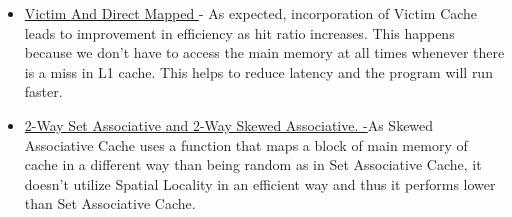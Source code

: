 \documentclass[12pt]{article}
\begin{document}
\begin{itemize}
	\item {\fontsize{14pt}{16.8pt}\selectfont \uline{Victim And Direct Mapped }- As expected, incorporation of Victim Cache leads to improvement in efficiency as hit ratio increases. This happens because we don’t have to access the main memory at all times whenever there is a miss in L1 cache. This helps to reduce latency and the program will run faster.\par}\par

	\item {\fontsize{14pt}{16.8pt}\selectfont \uline{2-Way Set Associative and 2-Way Skewed Associative. -}As Skewed Associative Cache uses a function that maps a block of main memory of cache in a different way than being random as in Set Associative Cache, it doesn’t utilize Spatial Locality in an efficient way and thus it performs lower than Set Associative Cache. \par}
\end{itemize}\par


\vspace{\baselineskip}

\vspace{\baselineskip}
\tab 
\vspace{\baselineskip}
\vspace{\baselineskip}

\vspace{\baselineskip}

\vspace{\baselineskip}

\printbibliography
\end{document}

